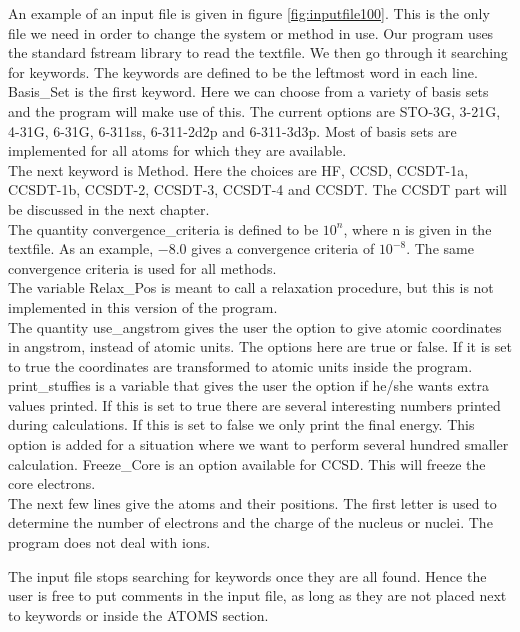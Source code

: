 \documentclass[a4paper,norsk,11pt,twoside]{report}
\begin{document}
An example of an input file is given in figure
\ref{fig:inputfile100}. This is the only file we need in order to change the
system or method in use. Our program uses the standard fstream library
to read the textfile. We then go through it searching for
keywords. The keywords are defined to be the leftmost word in each
line. \\

Basis\_Set is the first keyword. Here we can choose from a variety of
basis sets and the program will make use of this. The current options
are STO-3G, 3-21G, 4-31G, 6-31G, 6-311ss, 6-311-2d2p and
6-311-3d3p. Most of basis sets are implemented for all atoms for which
they are available. \\

The next keyword is Method. Here the choices are HF, CCSD, CCSDT-1a, CCSDT-1b, CCSDT-2, CCSDT-3, CCSDT-4 and CCSDT. The CCSDT part will be discussed in the next chapter. \\

The quantity convergence\_criteria is defined to be $10^{n}$, where n
is given in the textfile. As an example, $-8.0$ gives a convergence
criteria of $10^{-8}$. The same convergence criteria is used for all
methods. \\ The variable Relax\_Pos is meant to call a relaxation
procedure, but this is not implemented in this version of the
program. \\ The quantity use\_angstrom gives the user the option to
give atomic coordinates in angstrom, instead of atomic units. The
options here are true or false. If it is set to true the coordinates
are transformed to atomic units inside the program. \\

print\_stuffies is a variable that gives the user the option if he/she
wants extra values printed. If this is set to true there are several
interesting numbers printed during calculations. If this is set to
false we only print the final energy. This option is added for a
situation where we want to perform several hundred smaller
calculation. 
Freeze\_Core is an option available for CCSD. This will freeze the core electrons. \\

The next few lines give the atoms and their positions. The first
letter is used to determine the number of electrons and the charge of the nucleus or nuclei.
The program does not deal with ions. 

The input file stops searching for keywords once they are all
found. Hence the user is free to put comments in the input
file, as long as they are not placed next to keywords or inside the
ATOMS section.
\end{document}

